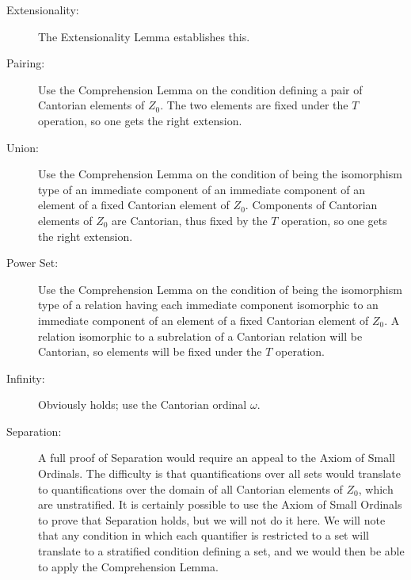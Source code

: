 \begin{description}
 \item[\fdescr Extensionality:]  The Extensionality
   Lemma establishes
   this.

 \item[\fdescr Pairing:] Use the Comprehension Lemma on
   the condition defining a pair of Cantorian
   elements of $Z_0$.  The two elements are fixed under the $T$ operation, so
   one gets the right extension. 

 \item[\fdescr Union:] Use the
   Comprehension Lemma on the condition of being 
   the isomorphism type of an immediate component of
   an immediate 
   component of an element of a fixed Cantorian
   element of $Z_0$. 
   Components of Cantorian elements of $Z_0$
   are Cantorian, thus fixed by the $T$ operation, so one gets the right
   extension.

 \item[\fdescr Power Set:] Use the
   Comprehension Lemma on the condition of 
   being the isomorphism type of a relation having each immediate
   component isomorphic to an immediate component of an element of a
   fixed Cantorian element of $Z_0$. A relation isomorphic to a subrelation of
   a Cantorian relation will be Cantorian, so
   elements will be fixed under the $T$ operation.

 \item[\fdescr Infinity:]  Obviously holds; use the Cantorian
   ordinal $\omega$.

 \item[\fdescr Separation:] A full proof of Separation would require an appeal to the Axiom of Small Ordinals.  The difficulty is that 
   quantifications over all sets would translate to quantifications over
   the domain of all Cantorian
   elements of $Z_0$, which are unstratified. 
   It is certainly possible to use the Axiom of Small Ordinals to prove
   that Separation holds, but we will not do it here.  We will note that
   any condition in which each quantifier is restricted to a set will
   translate to a stratified condition defining a set, and we would then
   be able to apply the Comprehension Lemma.
\end{description}

